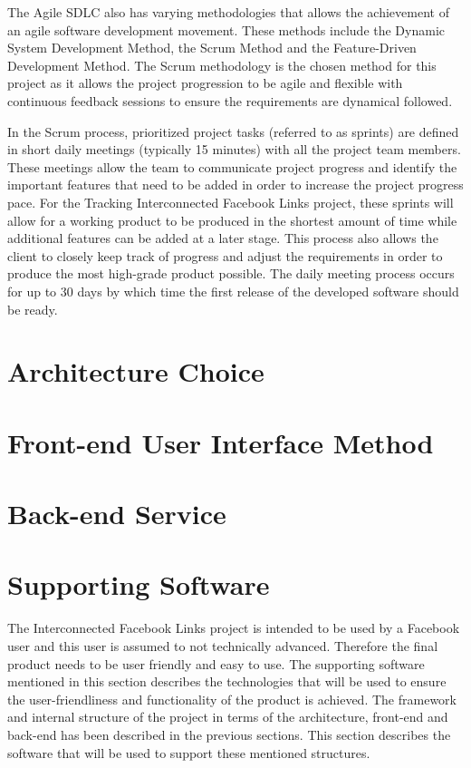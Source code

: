 \documentclass[10pt,onecolumn]{article}
\begin{document}
The Agile SDLC also has varying methodologies that allows the achievement of an agile software development movement. These methods include the Dynamic System Development Method, the Scrum Method and the Feature-Driven Development Method. The Scrum methodology is the chosen method for this project as it allows the project progression to be agile and flexible with continuous feedback sessions to ensure the requirements are dynamical followed\cite{Kinsey}.

In the Scrum process, prioritized project tasks (referred to as sprints) are defined in short daily meetings (typically 15 minutes) with all the project team members. These meetings allow the team to communicate project progress and identify the important features that need to be added in order to increase the project progress pace. For the Tracking Interconnected Facebook Links project, these sprints will allow for a working product to be produced in the shortest amount of time while additional features can be  added at a later stage. This process also allows the client to closely keep track of progress and adjust the requirements in order to produce the most high-grade product possible. The daily meeting process occurs for up to 30 days by which time the first release of the developed software should be ready.   


\section{Architecture Choice}

\section{Front-end User Interface Method}
\section{Back-end Service}
\section{Supporting Software}
The Interconnected Facebook Links project is intended to be used by a Facebook user and this user is assumed to not technically advanced. Therefore the final product needs to be user friendly and easy to use. The supporting software mentioned in this section describes the technologies that will be used to ensure the user-friendliness and functionality of the product is achieved. The framework and internal structure  of the project in terms of the architecture, front-end and back-end has been described in the previous sections. This section describes the software that will be used to support these mentioned structures.
\end{document}
